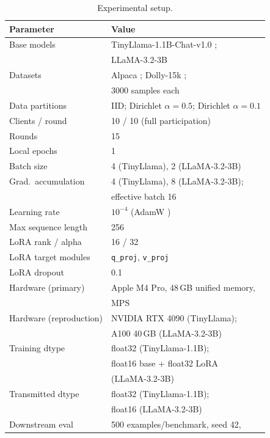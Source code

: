 \begin{table}[t]
\caption{Experimental setup.}
\label{tab:setup}
\begin{center}
\setlength{\tabcolsep}{3pt}
\renewcommand{\arraystretch}{0.95}
\footnotesize
{
\begin{tabular}{ll}
\toprule
Parameter & Value \\
\midrule
Base models & TinyLlama-1.1B-Chat-v1.0 \cite{zhang2024tinyllama}; \\
            & LLaMA-3.2-3B \cite{dubey2024llama3} \\
Datasets & Alpaca \cite{taori2023alpaca}; Dolly-15k \cite{dolly2023}; \\
            & 3000 samples each \\
Data partitions & IID; Dirichlet $\alpha{=}0.5$; Dirichlet $\alpha{=}0.1$ \\
Clients / round & 10 / 10 (full participation) \\
Rounds & 15 \\
Local epochs & 1 \\
Batch size & 4 (TinyLlama), 2 (LLaMA-3.2-3B) \\
Grad.\ accumulation & 4 (TinyLlama), 8 (LLaMA-3.2-3B); \\
            & effective batch 16 \\
Learning rate & $10^{-4}$ (AdamW \cite{loshchilov2019decoupled}) \\
Max sequence length & 256 \\
LoRA rank / alpha & 16 / 32 \\
LoRA target modules & \texttt{q\_proj}, \texttt{v\_proj} \\
LoRA dropout & 0.1 \\
Hardware (primary) & Apple M4 Pro, 48\,GB unified memory, \\
            & MPS \\
Hardware (reproduction) & NVIDIA RTX 4090 (TinyLlama); \\
            & A100 40\,GB (LLaMA-3.2-3B) \\
Training dtype & float32 (TinyLlama-1.1B); \\
            & float16 base + float32 LoRA \\
            & (LLaMA-3.2-3B) \\
Transmitted dtype & float32 (TinyLlama-1.1B); \\
            & float16 (LLaMA-3.2-3B) \\
Downstream eval & 500 examples/benchmark, seed 42, \\

\end{tabular}}
\end{center}
\end{table}
